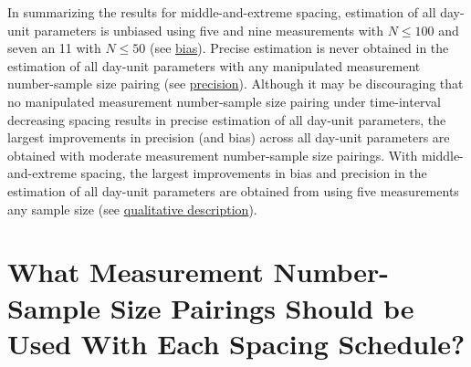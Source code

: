 \documentclass[
12pt, %
twoside,
english]{guelphthesis}
\theoremstyle{definition}
\theoremstyle{definition}
\theoremstyle{definition}
\theoremstyle{definition}
\theoremstyle{remark}
\begin{document}
In summarizing the results for middle-and-extreme spacing, estimation of all day-unit parameters is unbiased using five and nine measurements with \(N \le 100\) and seven an 11 with \(N \le 50\) (see \protect\hyperlink{bias-mid-ext-exp2}{bias}). Precise estimation is never obtained in the estimation of all day-unit parameters with any manipulated measurement number-sample size pairing (see \protect\hyperlink{precision-mid-ext-exp2}{precision}). Although it may be discouraging that no manipulated measurement number-sample size pairing under time-interval decreasing spacing results in precise estimation of all day-unit parameters, the largest improvements in precision (and bias) across all day-unit parameters are obtained with moderate measurement number-sample size pairings. With middle-and-extreme spacing, the largest improvements in bias and precision in the estimation of all day-unit parameters are obtained from using five measurements any sample size (see \protect\hyperlink{qualitative-mid-ext-exp2}{qualitative description}).

\hypertarget{what-measurement-number-sample-size-pairings-should-be-used-with-each-spacing-schedule}{%
\section{What Measurement Number-Sample Size Pairings Should be Used With Each Spacing Schedule?}\label{what-measurement-number-sample-size-pairings-should-be-used-with-each-spacing-schedule}}
\end{document}
